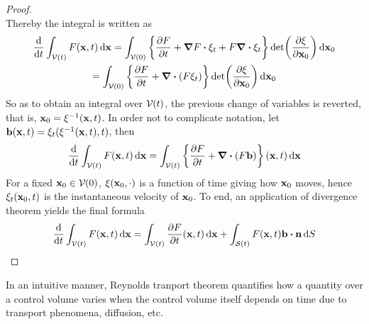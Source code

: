 \begin{proof}
\begin{equation*}
	\end{equation*}
	Thereby the integral is written as
	\begin{multline*}
		\frac{\dd}{\dd{t}} \int_\cvt F(\vb{x}, t) \dd{\vb{x}} = 
		\int_{\cv{}(0)} 
		\left\{
		\frac{\partial F}{\partial t} + \grad{F} \vdot \xi_t + F \div{\xi_t}
		\right\} \det(\frac{\partial \xi}{\partial \vb{x}_0}) \dd{\vb{x}_0} 
		\\ = 
		\int_{\cv{}(0)} 
		\left\{	\frac{\partial F}{\partial t} + \div(F \xi_t) \right\} \det(\frac{\partial \xi}{\partial \vb{x}_0}) \dd{\vb{x}_0}
	\end{multline*}
	So as to obtain an integral over $\mathcal{V}_{}(t)$, the previous change of variables is reverted, that is, $\vb{x}_0 = \xi^{-1}(\vb{x}, t)$. In order not to complicate notation, let $\vb{b}(\vb{x},t) = \xi_t(\xi^{-1}(\vb{x},t),t)$, then
	\begin{equation*}
		\frac{\dd}{\dd{t}} \int_{\mathcal{V}(t)} F(\vb{x}, t) \dd{\vb{x}} = 
		\int_{\mathcal{V}(t)} 
		\left\{ \frac{\partial F}{\partial t}  + \div(F \vb{b}) \right\} (\vb{x}, t) \dd{\vb{x}}
	\end{equation*}
	For a fixed $\vb{x}_0 \in \mathcal{V}_{}(0)$, $\xi(\vb{x}_0, \cdot)$ is a function of time giving how $\vb{x}_0$ moves, hence $\xi_t(\vb{x}_0, t)$ is the instantaneous velocity of $\vb{x}_0$. To end, an application of divergence theorem yields the final formula
	\begin{equation*}
		\frac{\dd}{\dd{t}} \int_\cvt F(\vb{x}, t) \dd{\vb{x}} = 
		\int_\cvt \frac{\partial F}{\partial t} (\vb{x}, t) \dd{\vb{x}} +
		\int_\cst F(\vb{x}, t) \vb{b} \vdot \vb{n} \dd{S}
	\end{equation*}
\end{proof}

In an intuitive manner, Reynolds tranport theorem quantifies how a quantity over a control volume varies when the control volume itself depends on time due to transport phenomena, diffusion, etc. 






